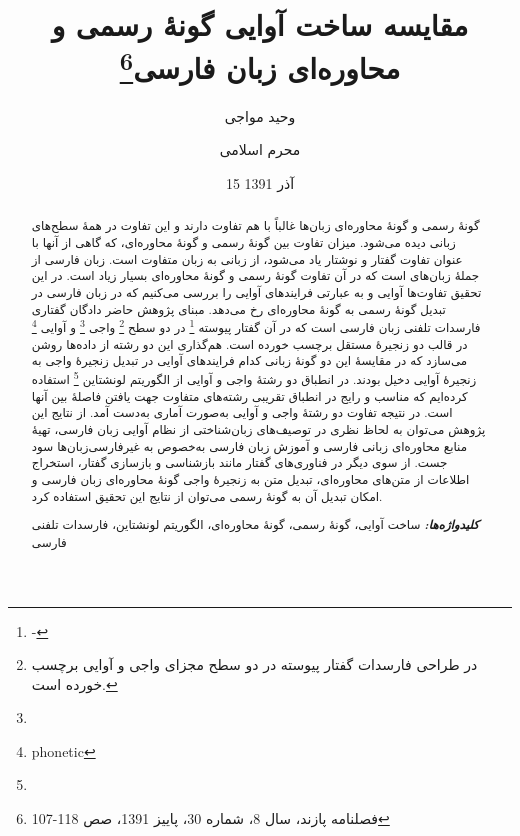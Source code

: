 \documentclass[12pt,onecolumn,a4paper]{article}
\providecommand{\keywords}[1]{\textbf{\textit{کلیدواژه‌ها:}} #1}
\begin{document}
    \title{مقایسه ساخت آوایی گونهٔ رسمی و محاوره‌ای زبان فارسی\footnote{فصلنامه پازند، سال 8، شماره 30، پاییز 1391، صص 118-107}}
    \author[1]{وحید مواجی}
    \author[2]{محرم اسلامی}
    \date{15 آذر 1391}
    \maketitle

    \begin{abstract}
        گونهٔ رسمی و گونهٔ محاوره‌ای زبان‌ها غالباً با هم تفاوت‌ دارند و این تفاوت در همهٔ سطح‌های زبانی دیده می‌شود. میزان تفاوت بین گونهٔ رسمی و گونهٔ محاوره‌ای، که گاهی از آنها با عنوان تفاوت گفتار و نوشتار یاد می‌شود، از زبانی به زبان متفاوت است. زبان فارسی از جملهٔ زبان‌های است که در آن تفاوت گونهٔ رسمی و گونهٔ محاوره‌ای بسیار زیاد است. در این تحقیق تفاوت‌ها آوایی و به عبارتی فرایندهای آوایی را بررسی می‌کنیم که در زبان فارسی در تبدیل گونهٔ رسمی به گونهٔ محاوره‌ای رخ می‌دهد. مبنای پژوهش حاضر دادگان گفتاری فارسدات تلفنی زبان فارسی  است که در آن گفتار پیوسته
        \footnote{-}
        در دو سطح
        \footnote{در طراحی فارسدات گفتار پیوسته در دو سطح مجزای واجی و آوایی برچسب خورده است.}
        واجی \footnote{} و آوایی \footnote{‫‪phonetic‬‬} در قالب دو زنجیرهٔ مستقل برچسب خورده است. هم‌گذاری این دو رشته از داده‌ها روشن می‌سازد که در مقایسهٔ این دو گونهٔ زبانی کدام فرایندهای آوایی در تبدیل زنجیرهٔ واجی به زنجیرهٔ آوایی دخیل بودند. در انطباق دو رشتهٔ واجی و آوایی از الگوریتم لونشتاین \footnote{} استفاده کرده‌ایم که مناسب و رایج در انطباق تقریبی رشته‌های متفاوت جهت یافتن فاصلهٔ بین آنها است. در نتیجه تفاوت دو رشتهٔ واجی و آوایی به‌صورت آماری به‌دست آمد. از نتایج این پژوهش می‌توان به لحاظ نظری در توصیف‌های زبان‌شناختی از نظام آوایی زبان فارسی، تهیهٔ منابع محاوره‌ای زبانی فارسی و آموزش زبان فارسی به‌خصوص به غیرفارسی‌زبان‌ها سود جست. از سوی دیگر در فناوری‌های گفتار مانند بازشناسی و بازسازی گفتار، استخراج اطلاعات از متن‌های محاوره‌ای، تبدیل متن به زنجیرهٔ واجی گونهٔ محاوره‌ای زبان فارسی و امکان تبدیل آن به گونهٔ رسمی می‌توان از نتایج این تحقیق استفاده کرد.
        \par
        \keywords{ساخت آوایی، گونهٔ رسمی، گونهٔ محاوره‌ای، الگوریتم لونشتاین، فارسدات تلفنی فارسی}
    \end{abstract}
\end{document}
